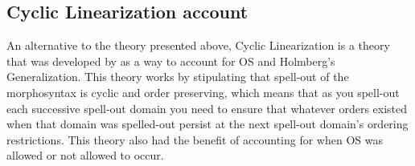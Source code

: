 \documentclass[12pt, letterpaper]{article}
\newcommand{\sub}[1]{\textsubscript{#1}}
\begin{document}




\subsection{Cyclic Linearization account} \label{sec:CL}

An alternative to the theory presented above, Cyclic Linearization is a theory that was developed by \cite{foxCyclicLinearizationSyntactic2005} as a way to account for OS and Holmberg's Generalization. This theory works by stipulating that spell-out of the morphosyntax is cyclic and order preserving, which means that as you spell-out each successive spell-out domain you need to ensure that whatever orders existed when that domain was spelled-out persist at the next spell-out domain's ordering restrictions. This theory also had the benefit of accounting for when OS was allowed or not allowed to occur. 
\end{document}
